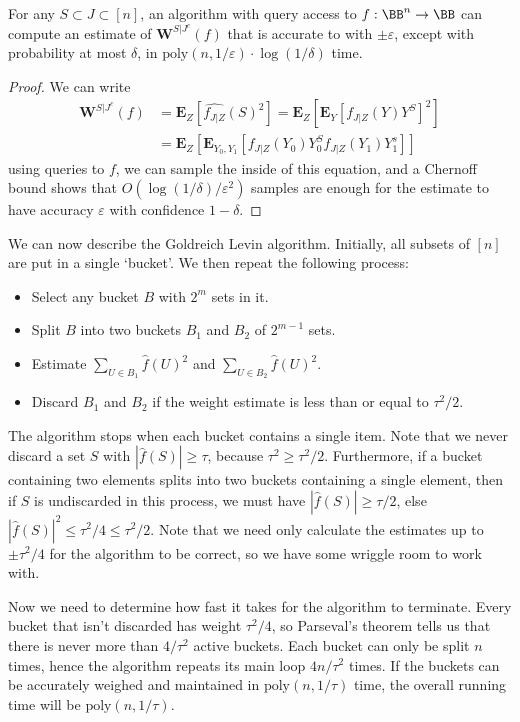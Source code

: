 \begin{theorem}
    For any $S \subset J \subset [n]$, an algorithm with query access to $f: \BB^n \to \BB$ can compute an estimate of $\mathbf{W}^{S|J^c}(f)$ that is accurate to with $\pm \varepsilon$, except with probability at most $\delta$, in $\text{poly}(n,1/\varepsilon) \cdot \log(1/\delta)$ time.
\end{theorem}
\begin{proof}
    We can write
    \begin{align*}
        \mathbf{W}^{S|J^c}(f) &= \mathbf{E}_Z[\widehat{f_{J|Z}}(S)^2] = \mathbf{E}_Z \left[ \mathbf{E}_Y \left[ f_{J|Z}(Y) Y^S \right]^2 \right]\\
        &= \mathbf{E}_Z \left[ \mathbf{E}_{Y_0,Y_1} \left[ f_{J|Z}(Y_0) Y_0^S f_{J|Z}(Y_1) Y_1^s \right] \right]
    \end{align*}
    using queries to $f$, we can sample the inside of this equation, and a Chernoff bound shows that $O(\log(1/\delta)/\varepsilon^2)$ samples are enough for the estimate to have accuracy $\varepsilon$ with confidence $1-\delta$.
\end{proof}

We can now describe the Goldreich Levin algorithm. Initially, all subsets of $[n]$ are put in a single `bucket'. We then repeat the following process:
%
\begin{itemize}
    \item Select any bucket $B$ with $2^m$ sets in it.
    \item Split $B$ into two buckets $B_1$ and $B_2$ of $2^{m-1}$ sets.
    \item Estimate $\sum_{U \in B_1} \widehat{f}(U)^2$ and $\sum_{U \in B_2} \widehat{f}(U)^2$.
    \item Discard $B_1$ and $B_2$ if the weight estimate is less than or equal to $\tau^2/2$.
\end{itemize}
%
The algorithm stops when each bucket contains a single item. Note that we never discard a set $S$ with $|\widehat{f}(S)| \geq \tau$, because $\tau^2 \geq \tau^2/2$. Furthermore, if a bucket containing two elements splits into two buckets containing a single element, then if $S$ is undiscarded in this process, we must have $|\widehat{f}(S)| \geq \tau/2$, else $|\widehat{f}(S)|^2 \leq \tau^2/4 \leq \tau^2/2$. Note that we need only calculate the estimates up to $\pm \tau^2/4$ for the algorithm to be correct, so we have some wriggle room to work with.

Now we need to determine how fast it takes for the algorithm to terminate. Every bucket that isn't discarded has weight $\tau^2/4$, so Parseval's theorem tells us that there is never more than $4/\tau^2$ active buckets. Each bucket can only be split $n$ times, hence the algorithm repeats its main loop $4n/\tau^2$ times. If the buckets can be accurately weighed and maintained in $\text{poly}(n,1/\tau)$ time, the overall running time will be $\text{poly}(n,1/\tau)$.

